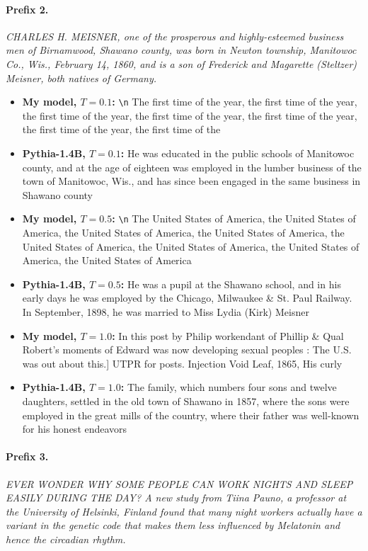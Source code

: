 \documentclass{article}
\begin{document}
\paragraph{Prefix 2.} \textit{CHARLES H. MEISNER, one of the prosperous and highly-esteemed business men of Birnamwood, Shawano county, was born in Newton township, Manitowoc Co., Wis., February 14, 1860, and is a son of Frederick and Magarette (Steltzer) Meisner, both natives of Germany.}

\begin{itemize}
  \item \textbf{My model, $T=0.1$:}  \texttt{\textbackslash n} The first time of the year, the first time of the year, the first time of the year, the first time of the year, the first time of the year, the first time of the year, the first time of the
  \item \textbf{Pythia-1.4B, $T=0.1$:}  He was educated in the public schools of Manitowoc county, and at the age of eighteen was employed in the lumber business of the town of Manitowoc, Wis., and has since been engaged in the same business in Shawano county
  \item \textbf{My model, $T=0.5$:}  \texttt{\textbackslash n} The United States of America, the United States of America, the United States of America, the United States of America, the United States of America, the United States of America, the United States of America, the United States of America
  \item \textbf{Pythia-1.4B, $T=0.5$:}  He was a pupil at the Shawano school, and in his early days he was employed by the Chicago, Milwaukee \& St. Paul Railway. In September, 1898, he was married to Miss Lydia (Kirk) Meisner
  \item \textbf{My model, $T=1.0$:}  In this post by Philip workendant of Phillip \& Qual Robert's moments of Edward was now developing sexual peoples : The U.S. was out about this.] UTPR for posts. Injection Void Leaf, 1865, His curly
  \item \textbf{Pythia-1.4B, $T=1.0$:}  The family, which numbers four sons and twelve daughters, settled in the old town of Shawano in 1857, where the sons were employed in the great mills of the country, where their father was well-known for his honest endeavors
\end{itemize}

\paragraph{Prefix 3.} \textit{EVER WONDER WHY SOME PEOPLE CAN WORK NIGHTS AND SLEEP EASILY DURING THE DAY? A new study from Tiina Pauno, a professor at the University of Helsinki, Finland found that many night workers actually have a variant in the genetic code that makes them less influenced by Melatonin and hence the circadian rhythm.}
\end{document}
